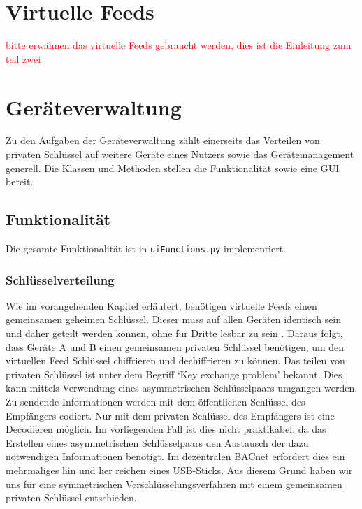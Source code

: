 \documentclass[a4paper,titlepage]{article}
\newcommand{\ilc}[1]{\textcolor{codeColor}{\texttt{#1}}}
\begin{document}
\section{Virtuelle Feeds}

\textcolor{red}{bitte erwähnen das virtuelle Feeds gebraucht werden, dies ist die Einleitung zum teil zwei}





\section{Geräteverwaltung}
Zu den Aufgaben der Geräteverwaltung zählt einerseits das Verteilen von privaten Schlüssel auf weitere Geräte eines Nutzers sowie das Gerätemanagement generell.  Die Klassen und Methoden stellen die Funktionalität sowie eine GUI bereit.

\subsection{Funktionalität}
Die gesamte Funktionalität ist in \ilc{uiFunctions.py} implementiert. 

\subsubsection*{Schlüsselverteilung}
Wie im vorangehenden Kapitel erläutert, benötigen virtuelle Feeds einen gemeinsamen geheimen Schlüssel. Dieser muss auf allen Geräten identisch sein und daher geteilt werden können, ohne für Dritte lesbar zu sein . Daraus folgt, dass Geräte A und B einen gemeinsamen privaten Schlüssel benötigen, um den virtuellen Feed Schlüssel chiffrieren und dechiffrieren zu können.  Das teilen von privaten Schlüssel ist unter dem Begriff `Key exchange problem' bekannt. Dies kann mittels Verwendung eines asymmetrischen Schlüsselpaars umgangen werden. Zu sendende Informationen werden mit dem öffentlichen Schlüssel des Empfängers codiert. Nur mit dem privaten Schlüssel des Empfängers ist eine Decodieren möglich. Im vorliegenden Fall ist dies nicht praktikabel, da das Erstellen eines asymmetrischen Schlüsselpaars den Austausch der dazu notwendigen Informationen benötigt. Im dezentralen BACnet erfordert dies ein mehrmaliges hin und her reichen eines USB-Sticks. Aus diesem Grund haben wir uns für eine symmetrischen Verschlüsselungsverfahren mit einem gemeinsamen privaten Schlüssel entschieden. 
\end{document}
